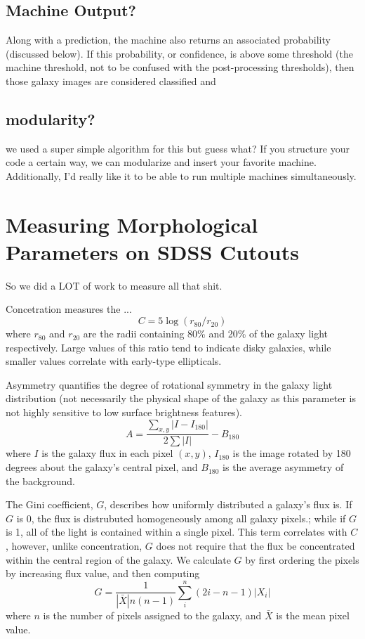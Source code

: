 \documentclass[twocolumn]{aastex6}
\newcommand{\rr}[1]{$r_{#1}$}
\begin{document}
\subsection{Machine Output?}
Along with a prediction, the machine also returns an associated probability (discussed below). If this probability, or confidence, is above some threshold (the machine threshold, not to be confused with the post-processing thresholds), then those galaxy images are considered classified and




\subsection{modularity?}
we used a super simple algorithm for this but guess what? If you structure your code a certain way, we can modularize and insert your favorite machine. Additionally, I'd really like it to be able to run multiple machines simultaneously. 




\appendix

\section{Measuring Morphological Parameters on SDSS Cutouts}

So we did a LOT of work to measure all that shit. 


Concetration measures the ... 
\begin{equation}
C = 5\log(r_{80}/ r_{20})
\end{equation}
where \rr{80} and \rr{20} are the radii containing 80\% and 20\% of the galaxy light respectively.  Large values of this ratio tend to indicate disky galaxies, while smaller values correlate with early-type ellipticals. 

Asymmetry quantifies the degree of rotational symmetry in the galaxy light distribution (not necessarily the physical shape of the galaxy as this parameter is not highly sensitive to low surface brightness features).  
\begin{equation}
A = \frac{\sum_{x,y} |I - I_{180}|}{ 2\sum|I|} - B_{180}
\end{equation}
where $I$ is the galaxy flux in each pixel $(x, y)$, $I_{180}$ is the image rotated by 180 degrees about the galaxy's central pixel, and $B_{180}$ is the average asymmetry of the background. 

The Gini coefficient, $G$, describes how uniformly distributed a galaxy's flux is.  If $G$ is 0, the flux is distrubuted homogeneously among all galaxy pixels.; while if $G$ is 1,  all of the light is contained within a single pixel. This term correlates with $C$, however, unlike concentration, $G$ does not require that the flux be concentrated within the central region of the galaxy.  We calculate $G$ by first ordering the pixels by increasing flux value, and then computing
\begin{equation}
G = \frac{1}{|\bar X|n(n-1)}\sum_i^n(2i-n-1)|X_i|
\end{equation}
where $n$ is the number of pixels assigned to the galaxy, and $\bar X$ is the mean pixel value. 
\end{document}
